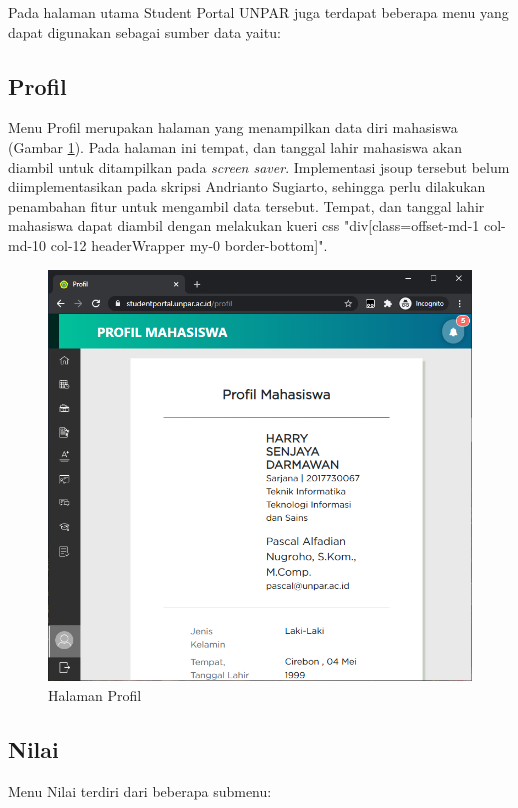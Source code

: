 Pada halaman utama Student Portal UNPAR juga terdapat beberapa menu yang dapat digunakan sebagai sumber data yaitu:

\subsection{Profil}
    Menu Profil merupakan halaman yang menampilkan data diri mahasiswa (Gambar \ref{fig:3_profil}). Pada halaman ini tempat, dan tanggal lahir mahasiswa akan diambil untuk ditampilkan pada \textit{screen saver}. Implementasi jsoup tersebut belum diimplementasikan pada skripsi Andrianto Sugiarto, sehingga perlu dilakukan penambahan fitur untuk mengambil data tersebut. Tempat, dan tanggal lahir mahasiswa dapat diambil dengan melakukan kueri css "div[class=offset-md-1 col-md-10 col-12 headerWrapper my-0 border-bottom]".
    \begin{figure}[H]
    	\centering
    	\includegraphics[scale=0.45]{Gambar/profil.png}
    	\caption{Halaman Profil} 
    	\label{fig:3_profil}
    \end{figure}
    
\subsection{Nilai}
    Menu Nilai terdiri dari beberapa submenu:
    
